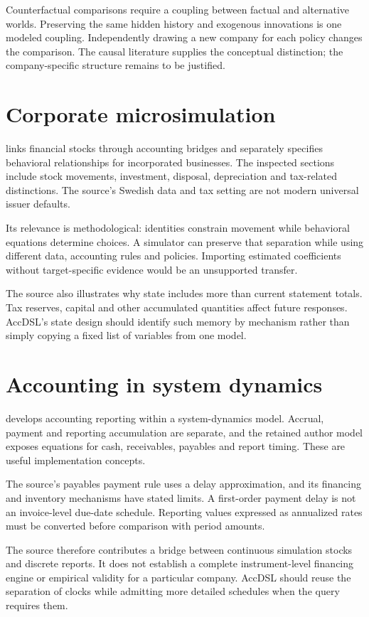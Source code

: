 Counterfactual comparisons require a coupling between factual and alternative worlds. Preserving the same hidden history and exogenous innovations is one modeled coupling. Independently drawing a new company for each policy changes the comparison. The causal literature supplies the conceptual distinction; the company-specific structure remains to be justified.

\section{Corporate microsimulation}
\citet{shahnazarian2004} links financial stocks through accounting bridges and separately specifies behavioral relationships for incorporated businesses. The inspected sections include stock movements, investment, disposal, depreciation and tax-related distinctions. The source's Swedish data and tax setting are not modern universal issuer defaults.

Its relevance is methodological: identities constrain movement while behavioral equations determine choices. A simulator can preserve that separation while using different data, accounting rules and policies. Importing estimated coefficients without target-specific evidence would be an unsupported transfer.

The source also illustrates why state includes more than current statement totals. Tax reserves, capital and other accumulated quantities affect future responses. AccDSL's state design should identify such memory by mechanism rather than simply copying a fixed list of variables from one model.

\section{Accounting in system dynamics}
\citet{pierson2020} develops accounting reporting within a system-dynamics model. Accrual, payment and reporting accumulation are separate, and the retained author model exposes equations for cash, receivables, payables and report timing. These are useful implementation concepts.

The source's payables payment rule uses a delay approximation, and its financing and inventory mechanisms have stated limits. A first-order payment delay is not an invoice-level due-date schedule. Reporting values expressed as annualized rates must be converted before comparison with period amounts.

The source therefore contributes a bridge between continuous simulation stocks and discrete reports. It does not establish a complete instrument-level financing engine or empirical validity for a particular company. AccDSL should reuse the separation of clocks while admitting more detailed schedules when the query requires them.

